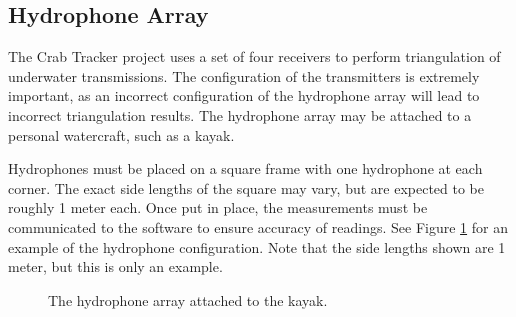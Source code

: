 \documentclass[12pt]{article}
\begin{document}
\subsection{Hydrophone Array}

The Crab Tracker project uses a set of four receivers to perform triangulation
of underwater transmissions.
The configuration of the transmitters is extremely important, as an incorrect
configuration of the hydrophone array will lead to incorrect triangulation
results.
The hydrophone array may be attached to a personal watercraft, such as a kayak.

Hydrophones must be placed on a square frame with one hydrophone at each
corner.
The exact side lengths of the square may vary, but are expected to be roughly
1 meter each.
Once put in place, the measurements must be communicated to the
software to ensure accuracy of readings.
See Figure \ref{fig:array} for an example of the hydrophone configuration.
Note that the side lengths shown are 1 meter, but this is only an example.

\begin{figure}[h]
\begin{center}
\end{center}
\caption{The hydrophone array attached to the kayak.}
\label{fig:array}
\end{figure}
\end{document}
